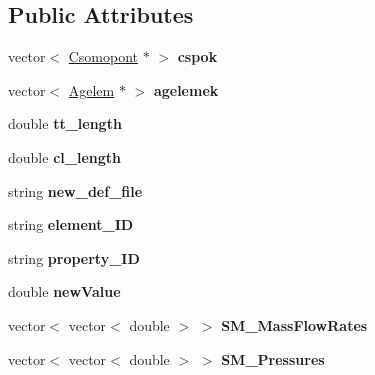 \subsection*{Public Attributes}
\begin{DoxyCompactItemize}
\item 
\mbox{\label{class_staci_a1b5c85269be922a1ed62890cd88e67db}} 
vector$<$ \hyperlink{class_csomopont}{Csomopont} $\ast$ $>$ {\bfseries cspok}
\item 
\mbox{\label{class_staci_a6ca23dec6bf9e864efe535d836b7d02d}} 
vector$<$ \hyperlink{class_agelem}{Agelem} $\ast$ $>$ {\bfseries agelemek}
\item 
\mbox{\label{class_staci_a23892863b8dba7d6493cbf474042f900}} 
double {\bfseries tt\+\_\+length}
\item 
\mbox{\label{class_staci_acaa2f299629d12a61ab95b8522ef291a}} 
double {\bfseries cl\+\_\+length}
\item 
\mbox{\label{class_staci_a2b3fec06ed59e026c2c34b7f82bf32e7}} 
string {\bfseries new\+\_\+def\+\_\+file}
\item 
\mbox{\label{class_staci_a257ffac68d249e9ad21b982b8ea995c5}} 
string {\bfseries element\+\_\+\+ID}
\item 
\mbox{\label{class_staci_a9978fa86e2702420213256cd41e5de39}} 
string {\bfseries property\+\_\+\+ID}
\item 
\mbox{\label{class_staci_a52df2bacb03971d6b49f28b5d57d8db5}} 
double {\bfseries new\+Value}
\item 
\mbox{\label{class_staci_aa4c3b6e4e9c54ab81cfb9e33ad2b26f8}} 
vector$<$ vector$<$ double $>$ $>$ {\bfseries S\+M\+\_\+\+Mass\+Flow\+Rates}
\item 
\mbox{\label{class_staci_a9e91205defa3e90dbfb6e93e229d3ee2}} 
vector$<$ vector$<$ double $>$ $>$ {\bfseries S\+M\+\_\+\+Pressures}
\item 
\mbox{\label{class_staci_ae5c1647a9b240fbcd91a684570c422e5}} 

\end{DoxyCompactItemize}
